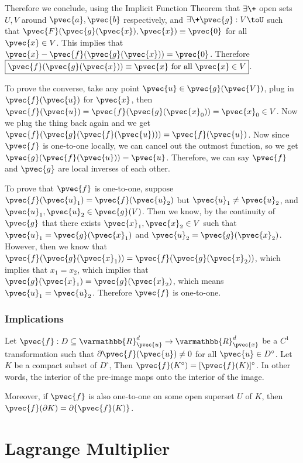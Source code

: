 \documentclass[11 pt, twoside]{article}
\begin{document}
Therefore we conclude, using the Implicit Function Theorem that $\exists\+$ open
sets $U, V$ around $\pvec{a}, \pvec{b}$ respectively, and $\exists\+ \pvec{g}:
V\toU$ such that $\pvec{F}(\pvec{g}(\pvec{x}), \pvec{x}) \equiv \pvec{0}$ for all
$\pvec{x} \in V$. This implies that $\pvec{x} - \pvec{f}(\pvec{g}(\pvec{x})) =
\pvec{0}$. Therefore $\boxed{\pvec{f}(\pvec{g}(\pvec{x})) \equiv \pvec{x} \text{ for
all } \pvec{x} \in V}$.

To prove the converse, take any point $\pvec{u} \in \pvec{g}(\pvec{V})$, plug in
$\pvec{f}(\pvec{u})$ for $\pvec{x}$, then $\pvec{f}(\pvec{u}) =
\pvec{f}(\pvec{g}(\pvec{x}_0)) = \pvec{x}_0 \in V$. Now we plug the thing back again
and we get $\pvec{f}(\pvec{g}(\pvec{f}(\pvec{u}))) = \pvec{f}(\pvec{u})$. Now since
$\pvec{f}$ is one-to-one locally, we can cancel out the outmost function, so we
get $\pvec{g}(\pvec{f}(\pvec{u})) = \pvec{u}$. Therefore, we can say $\pvec{f}$ and
$\pvec{g}$ are local inverses of each other.

To prove that $\pvec{f}$ is one-to-one, suppose $\pvec{f}(\pvec{u}_1) =
\pvec{f}(\pvec{u}_2)$ but $\pvec{u}_1 \neq \pvec{u}_2$, and $\pvec{u}_1, \pvec{u}_2
\in \pvec{g}(V)$. Then we know, by the continuity of $\pvec{g}$ that there exists
$\pvec{x}_1, \pvec{x}_2 \in V$ such that $\pvec{u}_1 = \pvec{g}(\pvec{x}_1)$ and
$\pvec{u}_2 = \pvec{g}(\pvec{x}_2)$. However, then we know that
$\pvec{f}(\pvec{g}(\pvec{x}_1)) = \pvec{f}(\pvec{g}(\pvec{x}_2))$, which implies that
$x_1 = x_2$, which implies that $\pvec{g}(\pvec{x}_1) = \pvec{g}(\pvec{x}_2)$, which
means $\pvec{u}_1 = \pvec{u}_2$. Therefore $\pvec{f}$ is one-to-one.

\subsubsection{Implications}

Let $\pvec{f}: D \subseteq \varmathbb{R}^d_{\pvec{u}} \to
\varmathbb{R}^d_{\pvec{x}}$ be a $C^1$ transformation such that $\partial
\pvec{f}(\pvec{u}) \neq 0$ for all $\pvec{u} \in D^\circ$. Let $K$ be a compact
subset of $D^\circ$, Then $\pvec{f}(K^\circ) = [\pvec{f}(K)]^\circ$. In other
words, the interior of the pre-image maps onto the interior of the image.

Moreover, if $\pvec{f}$ is also one-to-one on some open superset $U$ of $K$, then
$\pvec{f}(\partial K) = \partial \{\pvec{f}(K)\}$.


\section{Lagrange Multiplier}
\end{document}
